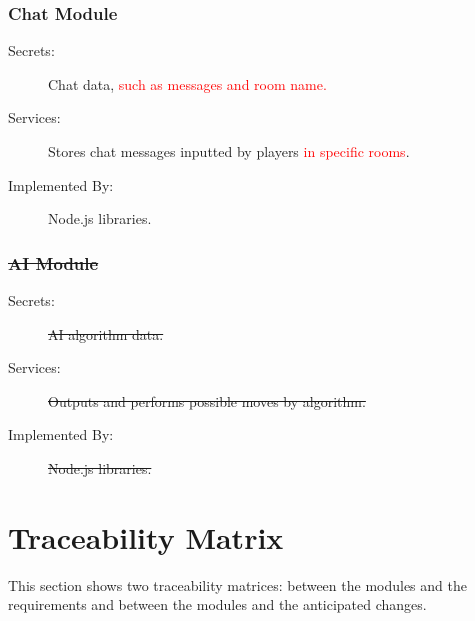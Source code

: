 \documentclass[12pt, titlepage]{article}
\begin{document}
    \subsubsection{Chat Module \label{mChat}}
    \begin{description}
    \item[Secrets:] Chat data, \textcolor{red}{such as messages and room name.}
    \item[Services:] Stores chat messages inputted by players \textcolor{red}{in specific rooms}.
    \item[Implemented By:] Node.js libraries.
    \end{description}
    
    \subsubsection{\sout{AI Module} \label{mAI}}
    \begin{description}
    \item[Secrets:] \sout{AI algorithm data.}
    \item[Services:] \sout{Outputs and performs possible moves by algorithm.}
    \item[Implemented By:] \sout{Node.js libraries.}
    \end{description}
    
\section{Traceability Matrix} \label{SecTM}

This section shows two traceability matrices: between the modules and the
requirements and between the modules and the anticipated changes.

\end{document}
